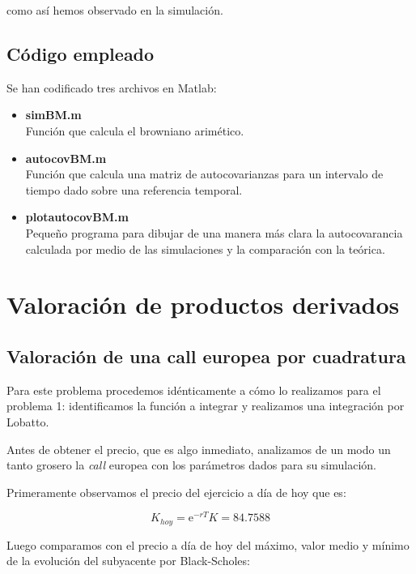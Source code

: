 \documentclass[a4paper,11pt]{article}
\begin{document}
como as\'i hemos observado en la simulaci\'on.

\subsection{C\'odigo empleado}

Se han codificado tres archivos en Matlab:
\begin{itemize}
   \item \textbf{simBM.m}\\
      Funci\'on que calcula el browniano arim\'etico.
   \item \textbf{autocovBM.m}\\
      Funci\'on que calcula una matriz de autocovarianzas para un intervalo de
      tiempo dado sobre una referencia temporal.
   \item \textbf{plotautocovBM.m}\\
      Peque\~no programa para dibujar de una manera m\'as clara la
      autocovarancia calculada por medio de las simulaciones y la comparaci\'on
      con la te\'orica.
\end{itemize}

\newpage
\mbox{}

\pagebreak
\section{Valoraci\'on de productos derivados}

\subsection{Valoraci\'on de una call europea por cuadratura}

Para este problema procedemos id\'enticamente a c\'omo lo realizamos para el
problema 1: identificamos la funci\'on a integrar y realizamos una integraci\'on
por Lobatto.

Antes de obtener el precio, que es algo inmediato, analizamos de un
modo un tanto grosero la \textit{call} europea con los par\'ametros dados para
su simulaci\'on.

Primeramente observamos el precio del ejercicio a d\'ia de hoy que es:

\begin{equation*}
   K_{hoy} = \mathrm{e}^{-rT}K = 84.7588
\end{equation*}

Luego comparamos con el precio a d\'ia de hoy del m\'aximo, valor
medio y m\'inimo de la evoluci\'on del subyacente por Black-Scholes:
\end{document}
